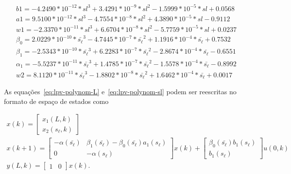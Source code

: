 \begin{equation}
	\label{eq:lpv-fs9}
	\begin{split}
		b1 = -4.2490*10^{-12} * sl^3 + 3.4291*10^{-9} * sl^2 - 1.5999*10^{-5} * sl + 0.0568                                     \\
		a1 = 9.5100*10^{-12} * sl^3 - 4.7554*10^{-8} * sl^2 + 4.3890*10^{-5} * sl - 0.9112                                      \\
		w1 = -2.3370*10^{-11} * sl^3 + 6.6704*10^{-8} * sl^2 - 5.7759*10^{-5} * sl + 0.0237                                     \\
		\beta_0 = 2.0229*10^{-10} * \bar{s_\ell}^3 - 4.7445*10^{-7} * \bar{s_\ell}^2 + 1.1916*10^{-4} * \bar{s_\ell} + 0.7532   \\
		\beta_1 = -2.5343*10^{-10} * \bar{s_\ell}^3 + 6.2283*10^{-7} * \bar{s_\ell}^2 - 2.8674*10^{-4} * \bar{s_\ell} - 0.6551  \\
		\alpha_1 = -5.5237*10^{-11} * \bar{s_\ell}^3 + 1.4785*10^{-7} * \bar{s_\ell}^2 - 1.5578*10^{-4} * \bar{s_\ell} - 0.8992 \\
		w2 = 8.1120*10^{-11} * \bar{s_\ell}^3 - 1.8802*10^{-8} * \bar{s_\ell}^2 + 1.6462*10^{-4} * \bar{s_\ell} + 0.0017
	\end{split}
\end{equation}

As equações~\eqref{eq:lpv-polynom-L} e~\eqref{eq:lpv-polynom-sl} podem ser
reescritas no formato de espaço de estados como

\begin{equation}
	\label{eq:lpv-ss}
	\begin{split}
		x(k) = 
		\begin{bmatrix}
			x_1(L,k) \\
			x_2(s_\ell,k)
		\end{bmatrix} \\
		x(k+1) =
		\begin{bmatrix}
			-\alpha{}(\bar{s_\ell}) &  \beta_1(\bar{s_\ell}) - \beta_0(\bar{s_\ell})a_1(s_\ell) \\
			0                       & -\alpha{}(s_\ell)
		\end{bmatrix}
		x(k) +
		\begin{bmatrix}
			\beta_0(\bar{s_\ell})b_1(s_\ell) \\
			b_1(s_\ell)
		\end{bmatrix}
		u(0,k) \\
		y(L,k) = 
		\begin{bmatrix}
			1 & 0
		\end{bmatrix}
		x(k).
	\end{split}
\end{equation}

